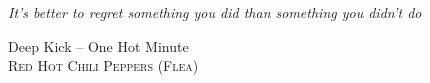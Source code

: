 
\setlength\epigraphrule{1.5pt}
\setlength{\epigraphwidth}{0.55\textwidth}
\thispagestyle{empty}
\vspace*{100pt}

\epigraph{\textit{\Large It's better to regret something you did than something you didn't do}}%
{Deep Kick -- One Hot Minute\\ \textsc{Red Hot Chili Peppers (Flea)}}
